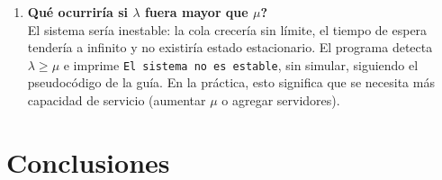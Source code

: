 \documentclass[11pt,a4paper]{article}
\begin{document}
\begin{enumerate}
    \item \textbf{\textquestiondown{}Qué ocurriría si $\lambda$ fuera mayor que $\mu$?}
    \\
    El sistema sería inestable: la cola crecería sin límite, el tiempo de
    espera tendería a infinito y no existiría estado estacionario. El programa
    detecta $\lambda \ge \mu$ e imprime \texttt{El sistema no es estable}, sin
    simular, siguiendo el pseudocódigo de la guía. En la práctica, esto
    significa que se necesita más capacidad de servicio (aumentar $\mu$ o
    agregar servidores).
\end{enumerate}

\section{Conclusiones}
\end{document}

